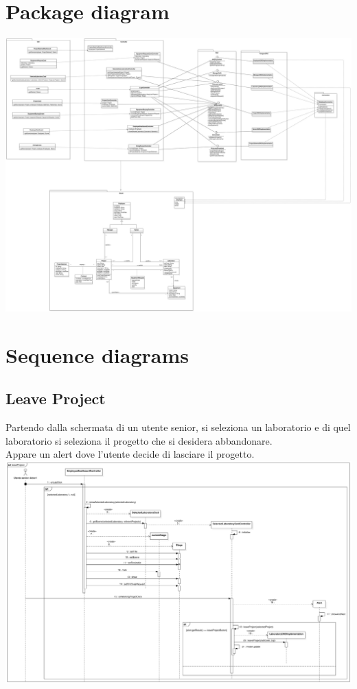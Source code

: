 \documentclass{article}
\begin{document}
\section{Package diagram}
\includegraphics[width=\textwidth]{images/package_diagram.png}

\newpage
\section{Sequence diagrams}
\subsection{Leave Project}
Partendo dalla schermata di un utente senior, si seleziona un laboratorio e di quel laboratorio si seleziona il progetto che si desidera abbandonare.\\
Appare un alert dove l'utente decide di lasciare il progetto.\medskip \\
\includegraphics[width=\textwidth]{images/sequence_diagram_1.png}\newpage
\end{document}
